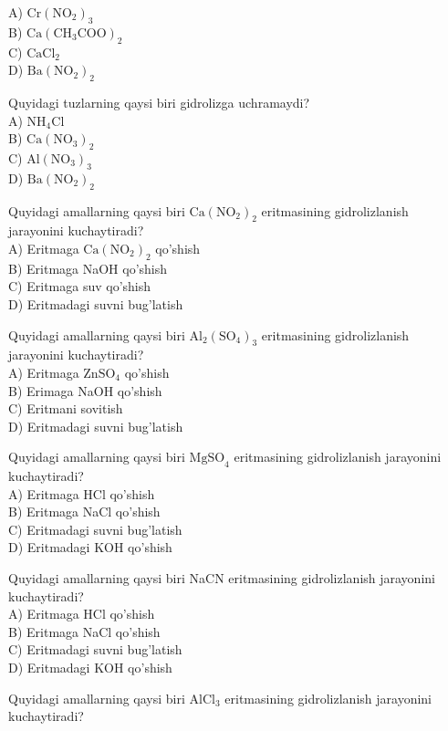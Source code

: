 A) $\mathrm{Cr}\left(\mathrm{NO}_{2}\right)_{3}$\\
B) $\mathrm{Ca}\left(\mathrm{CH}_{3} \mathrm{COO}\right)_{2}$\\
C) $\mathrm{CaCl}_{2}$\\
D) $\mathrm{Ba}\left(\mathrm{NO}_{2}\right)_{2}$
  \item Quyidagi tuzlarning qaysi biri gidrolizga uchramaydi?\\
A) $\mathrm{NH}_{4} \mathrm{Cl}$\\
B) $\mathrm{Ca}\left(\mathrm{NO}_{3}\right)_{2}$\\
C) $\mathrm{Al}\left(\mathrm{NO}_{3}\right)_{3}$\\
D) $\mathrm{Ba}\left(\mathrm{NO}_{2}\right)_{2}$
  \item Quyidagi amallarning qaysi biri $\mathrm{Ca}\left(\mathrm{NO}_{2}\right)_{2}$ eritmasining gidrolizlanish jarayonini kuchaytiradi?\\
A) Eritmaga $\mathrm{Ca}\left(\mathrm{NO}_{2}\right)_{2}$ qo'shish\\
B) Eritmaga NaOH qo'shish\\
C) Eritmaga suv qo'shish\\
D) Eritmadagi suvni bug'latish
  \item Quyidagi amallarning qaysi biri $\mathrm{Al}_{2}\left(\mathrm{SO}_{4}\right)_{3}$ eritmasining gidrolizlanish jarayonini kuchaytiradi?\\
A) Eritmaga $\mathrm{ZnSO}_{4}$ qo'shish\\
B) Erimaga NaOH qo'shish\\
C) Eritmani sovitish\\
D) Eritmadagi suvni bug'latish
  \item Quyidagi amallarning qaysi biri $\mathrm{MgSO}_{4}$ eritmasining gidrolizlanish jarayonini kuchaytiradi?\\
A) Eritmaga HCl qo'shish\\
B) Eritmaga NaCl qo'shish\\
C) Eritmadagi suvni bug'latish\\
D) Eritmadagi KOH qo'shish
  \item Quyidagi amallarning qaysi biri NaCN eritmasining gidrolizlanish jarayonini kuchaytiradi?\\
A) Eritmaga HCl qo'shish\\
B) Eritmaga NaCl qo'shish\\
C) Eritmadagi suvni bug'latish\\
D) Eritmadagi KOH qo'shish
  \item Quyidagi amallarning qaysi biri $\mathrm{AlCl}_{3}$ eritmasining gidrolizlanish jarayonini kuchaytiradi?\\
